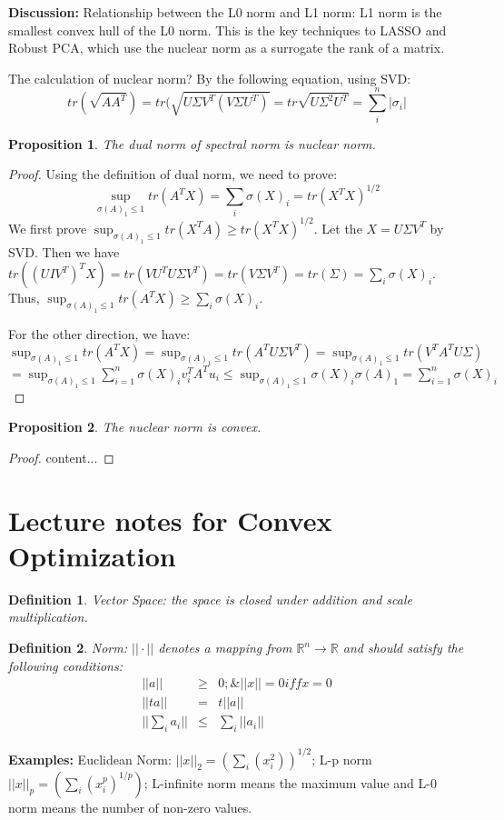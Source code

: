 \documentclass[12pt]{article}
\newtheorem{definition}{Definition}[section]
\newtheorem{proposition}{Proposition}[section]
\begin{document}
{\bf Discussion:} Relationship between the L0 norm and L1 norm: L1 norm is the smallest convex hull of the L0 norm. This is the key techniques to LASSO and Robust PCA, which use the nuclear norm as a surrogate the rank of a matrix. 

The calculation of nuclear norm? By the following equation, using SVD:
\[
tr(\sqrt{AA^T}) = tr(\sqrt{U\Sigma V^T (V\Sigma U^T)} = tr\sqrt{U\Sigma^2U^T} = \sum_i^n |\sigma_i|
\]
\begin{proposition}
	The dual norm of spectral norm is nuclear norm.
\end{proposition}
\begin{proof}
	Using the definition of dual norm, we need to prove:
	\[
	\sup_{\sigma(A)_1\le 1} tr(A^TX)=\sum_i\sigma(X)_i = tr(X^TX)^{1/2}
	\]
	We first prove $\sup_{\sigma(A)_1\le 1} tr(X^TA)\ge tr(X^TX)^{1/2}$. Let the $X=U\Sigma V^T$ by SVD. Then we have $tr((UIV^T)^TX)=tr(VU^TU\Sigma V^T)=tr(V\Sigma V^T)=tr(\Sigma)=\sum_i\sigma(X)_i$. Thus, $\sup_{\sigma(A)_1\le 1} tr(A^TX)\ge \sum_i\sigma(X)_i$. 
	
	For the other direction, we have: $\sup_{\sigma(A)_1\le 1} tr(A^TX) = \sup_{\sigma(A)_1\le 1} tr(A^TU\Sigma V^T)= \sup_{\sigma(A)_1\le 1} tr(V^TA^TU\Sigma) $ $= \sup_{\sigma(A)_1\le 1} \sum_{i=1}^n\sigma(X)_iv_i^TA^Tu_i\le \sup_{\sigma(A)_1\le 1}\sigma(X)_i\sigma(A)_1=\sum_{i=1}^n\sigma(X)_i$
\end{proof}
\begin{proposition}
	The nuclear norm is convex.
\end{proposition}
\begin{proof}
	content...
\end{proof}
\section{Lecture notes for Convex Optimization}
\begin{definition}
	Vector Space: the space is closed under addition and scale multiplication.
\end{definition}
\begin{definition}
	Norm: $||\cdot||$ denotes a mapping from $\mathbb{R}^n\to \mathbb{R}$ and should satisfy the following conditions:
	\begin{eqnarray}
		||a||&\ge& 0; \& ||x||=0 iff x=0 \\
		||ta|| &=& t||a||\\
		||\sum_i a_i|| &\le& \sum_i ||a_i||
	\end{eqnarray}
\end{definition}
{\bf Examples:} Euclidean Norm: $||x||_2 = (\sum_i(x_i^2))^{1/2}$; L-p norm $||x||_p=(\sum_i(x_i^p)^{1/p})$; L-infinite norm means the maximum value and L-0 norm means the number of non-zero values.
\end{document}
